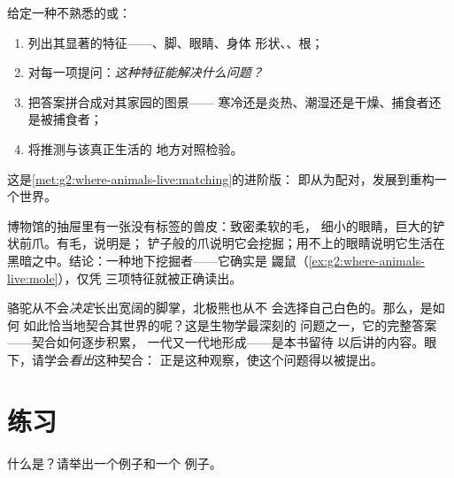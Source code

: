 \begin{method}[从生物的身体读出其所处的世界]\label{met:g4:adapted-to-their-world:read}
给定一种不熟悉的或：
\begin{enumerate}
  \item 列出其显著的特征——、脚、眼睛、身体
        形状、、根；
  \item 对每一项提问：\emph{这种特征能解决什么问题？}
  \item 把答案拼合成对其家园的图景——
        寒冷还是炎热、潮湿还是干燥、捕食者还是被捕食者；
  \item 将推测与该真正生活的
        地方对照检验。
\end{enumerate}
这是\cref{met:g2:where-animals-live:matching}的进阶版：
即从为配对，发展到重构一个世界。
\end{method}

\begin{example}[用此方法辨认一张神秘的兽皮]\label{ex:g4:adapted-to-their-world:mystery}
博物馆的抽屉里有一张没有标签的兽皮：致密柔软的毛，
细小的眼睛，巨大的铲状前爪。有毛，说明是；
铲子般的爪说明它会挖掘；用不上的眼睛说明它生活在
黑暗之中。结论：一种地下挖掘者——它确实是
鼹鼠（\cref{ex:g2:where-animals-live:mole}），仅凭
三项特征就被正确读出。
\end{example}

\begin{remark}[契合是怎样形成的？]\label{rem:g4:adapted-to-their-world:how}
骆驼从不会\emph{决定}长出宽阔的脚掌，北极熊也从不
会选择自己白色的。那么，是如何
如此恰当地契合其世界的呢？这是生物学最深刻的
问题之一，它的完整答案——契合如何逐步积累，
一代又一代地形成——是本书留待
以后讲的内容。眼下，请学会\emph{看出}这种契合：
正是这种观察，使这个问题得以被提出。
\end{remark}

\section{练习}

\begin{exercise}[$\star$]\label{exo:g4:adapted-to-their-world:1}
什么是？请举出一个例子和一个
例子。
\end{exercise}

